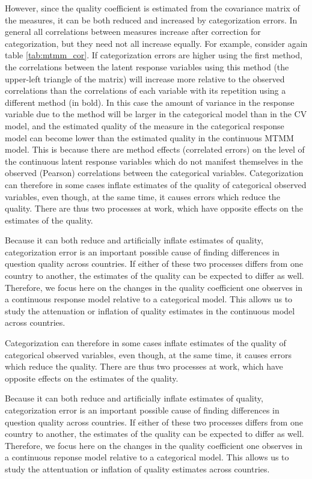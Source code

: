 \documentclass[a4paper,12pt]{article}
\begin{document}
However, since the quality coefficient is estimated from the covariance matrix of the measures, it can be both reduced and increased by categorization errors. In general all correlations between measures increase after correction for categorization, but they need not all increase equally. For example, consider again table \ref{tab:mtmm_cor}. If categorization errors are higher using the first method, the correlations between the latent response variables using this method (the upper-left triangle of the matrix) will increase more relative to the observed correlations than the correlations of each variable with its repetition using a different method (in bold). In this case the amount of variance in the response variable due to the method will be larger in the categorical model than in the CV model, and the estimated quality of the measure in the categorical response model can become lower than the estimated quality in the continuous MTMM model. This is because there are method effects (correlated errors) on the level of the continuous latent response variables which do not manifest themselves in the observed (Pearson) correlations between the categorical variables. Categorization can therefore in some cases inflate estimates of the quality of categorical observed variables, even though, at the same time, it causes errors which reduce the quality. There are thus two processes at work, which have opposite effects on the estimates of the quality.


Because it can both reduce and artificially inflate estimates of quality, categorization error is an important possible cause of finding differences in question quality across countries. If either of these two processes differs from one country to another, the estimates of the quality can be expected to differ as well. Therefore, we focus here on the changes in the quality coefficient one observes in a continuous response model relative to a categorical model. This allows us to study the attenuation or inflation of quality estimates in the continuous model across countries.


Categorization can therefore in some cases inflate estimates of the quality of categorical observed variables, even though, at the same time, it causes errors which reduce the quality. There are thus two processes at work, which have opposite effects on the estimates of the quality.

Because it can both reduce and artificially inflate estimates of quality, categorization error is an important possible cause of finding differences in question quality across countries. If either of these two processes differs from one country to another, the estimates of the quality can be expected to differ as well. Therefore, we focus here on the changes in the quality coefficient one observes in a continuous reponse model relative to a categorical model. This allows us to study the attentuation or inflation of quality estimates across countries.
\end{document}
